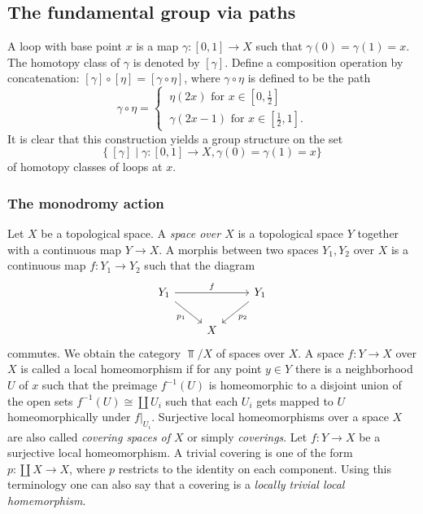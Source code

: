 \subsection{The fundamental group via paths}
    A loop with base point $x$ is a map $\gamma : [0,1] \to X$ such that $\gamma(0) = \gamma(1) = x$. The homotopy class of $\gamma $ is denoted by $[\gamma]$. Define a composition operation by concatenation: $[\gamma] \circ [\eta] = [\gamma \circ \eta]$, where $\gamma \circ \eta$ is defined to be the path 
    \[
      \gamma \circ \eta =
        \begin{cases}
            \ \eta(2x) \text{ for } x \in [0, \tfrac{1}{2}]\\
            \ \gamma(2x - 1) \text{ for } x \in [\tfrac{1}{2}, 1].
        \end{cases}
    \]
    It is clear that this construction yields a group structure on the set 
    \[
        \{\ [\gamma] \mid \gamma : [0,1] \to X , \gamma(0) = \gamma(1) = x \}
    \]
    of homotopy classes of loops at $x$.

\subsubsection{The monodromy action}

\begin{construction}
    Let $X$ be a topological space. A \textit{space over $X$ } is a topological space $Y$ together with a continuous map $Y \to X$. A morphis between two spaces $Y_1, Y_2$ over $X$ is a continuous map $f: Y_1 \to Y_2$ such that the diagram
    \[
    \begin{tikzcd}
    	{Y_1} && {Y_1} \\
    	& X
    	\arrow["f", from=1-1, to=1-3]
    	\arrow["{p_2}", from=1-3, to=2-2]
    	\arrow["{p_1}"', from=1-1, to=2-2]
    \end{tikzcd}
    \]
    commutes. We obtain the category $\Top/X$ of spaces over $X$.  A space $f: Y \to X$ over $X$ is called a local homeomorphism if for any point $y \in Y$ there is a neighborhood $U$ of $x$ such that the preimage $f^{-1}(U)$ is homeomorphic to a disjoint union of the open sets $f^{-1}(U) \cong \coprod U_i$ such that each $U_i$ gets mapped to $U$ homeomorphically under $f|_{U_i}$. Surjective local homeomorphisms over a space $X$ are also called \textit{covering spaces of $X$} or simply \textit{coverings}.  Let $f: Y \to X$ be a surjective local homeomorphism.  A trivial covering is one of the form $p: \coprod X \to X$, where $p$ restricts to the identity on each component. Using this terminology one can also say that a covering is a \textit{locally trivial local homemorphism}. 
\end{construction}

